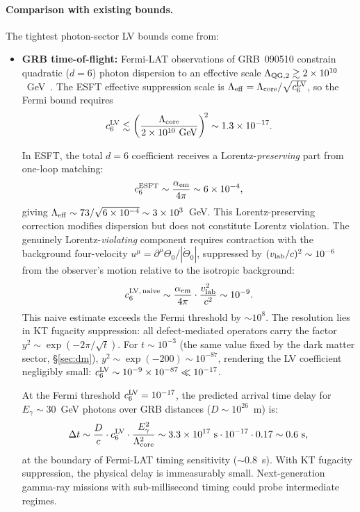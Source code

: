 ﻿\documentclass[a4paper,12pt]{article}
\begin{document}
\paragraph{Comparison with existing bounds.}
The tightest photon-sector LV bounds come from:
\begin{itemize}
  \item \textbf{GRB time-of-flight:} Fermi-LAT observations of
    GRB~090510 constrain quadratic ($d=6$) photon dispersion to
    an effective scale
    $\Lambda_{\rm QG,2}\gtrsim 2\times 10^{10}$~GeV~\cite{Fermi2009}.
    The ESFT effective suppression scale is
    $\Lambda_{\rm eff}=\Lambda_{\rm core}/\sqrt{c_6^{\rm LV}}$,
    so the Fermi bound requires
    \begin{equation}
      c_6^{\rm LV} \lesssim
        \left(\frac{\Lambda_{\rm core}}{2\times 10^{10}~\text{GeV}}\right)^{\!2}
        \sim 1.3\times 10^{-17}.
    \end{equation}

    In ESFT, the total $d=6$ coefficient receives a
    Lorentz-\emph{preserving} part from one-loop matching:
    \begin{equation}
      c_6^{\rm ESFT} \sim \frac{\alpha_{\rm em}}{4\pi}
        \sim 6\times 10^{-4},
      \label{eq:c6_est}
    \end{equation}
    giving $\Lambda_{\rm eff}\sim 73/\sqrt{6\times 10^{-4}}
    \sim 3\times 10^3$~GeV.  This Lorentz-preserving correction
    modifies dispersion but does not constitute Lorentz violation.
    The genuinely Lorentz-\emph{violating} component requires
    contraction with the background four-velocity
    $u^\mu=\partial^\mu\Theta_0/|\dot\Theta_0|$, suppressed by
    $(v_{\rm lab}/c)^2\sim 10^{-6}$ from the observer's motion
    relative to the isotropic background:
    \begin{equation}
      c_6^{\rm LV,\,naive} \sim \frac{\alpha_{\rm em}}{4\pi}
        \cdot\frac{v_{\rm lab}^2}{c^2}
        \sim 10^{-9}.
    \end{equation}
    This naive estimate exceeds the Fermi threshold by $\sim 10^{8}$.
    The resolution lies in KT fugacity suppression: all
    defect-mediated operators carry the factor
    $y^2\sim\exp(-2\pi/\sqrt{t})$.  For $t\sim 10^{-3}$ (the same
    value fixed by the dark matter sector, §\ref{sec:dm}),
    $y^2\sim\exp(-200)\sim 10^{-87}$, rendering the LV coefficient
    negligibly small:
    $c_6^{\rm LV}\sim 10^{-9}\times 10^{-87}\ll 10^{-17}$.

    At the Fermi threshold $c_6^{\rm LV}=10^{-17}$, the predicted
    arrival time delay for $E_\gamma\sim 30$~GeV photons over
    GRB distances ($D\sim 10^{26}$~m) is:
    \begin{equation}
      \Delta t \sim \frac{D}{c}\cdot c_6^{\rm LV}
        \cdot\frac{E_\gamma^2}{\Lambda_{\rm core}^2}
      \sim 3.3\times 10^{17}~\text{s}\cdot 10^{-17}\cdot 0.17
      \sim 0.6~\text{s},
    \end{equation}
    at the boundary of Fermi-LAT timing sensitivity ($\sim 0.8$~s).
    With KT fugacity suppression, the physical delay is immeasurably
    small.  Next-generation gamma-ray missions with sub-millisecond
    timing could probe intermediate regimes.


\end{itemize}
\end{document}
